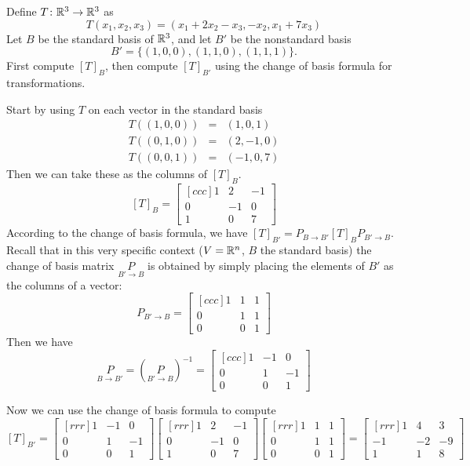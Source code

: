 \ii Define $T\colon {\mathbb R}^3\rightarrow{\mathbb R}^3$ as 
$$
T(x_1,x_2,x_3) = (x_1+2x_2-x_3,-x_2,x_1+7x_3)
$$
Let $B$ be the standard basis of ${\mathbb R}^3$, and let $B'$ be the nonstandard basis 
$$
B' = \{(1,0,0),(1,1,0),(1,1,1)\}.
$$
First compute $[T]_B$, then compute $[T]_{B'}$ using the change of basis formula for transformations. 
\\
\begin{solution}
\noindent
Start by using $T$ on each vector in the standard basis
\begin{eqnarray*}
T((1,0,0)) &=& (1,0,1)\\
T((0,1,0)) &=& (2,-1,0)\\
T((0,0,1)) &=& (-1,0,7)
\end{eqnarray*}
Then we can take these as the columns of $[T]_B$.
$$
[T]_B =
\begin{bmatrix}[ccc]
1&2&-1\\
0&-1&0\\
1&0&7
\end{bmatrix}
$$
According to the change of basis formula, we have  $[T]_{B'} = P_{B\rightarrow B'}[T]_BP_{B'\rightarrow B}$. 
Recall that in this very specific context ($V={\mathbb R}^n$, $B$ the standard basis) the change of basis matrix $\underset{B'\rightarrow B}{P}$ is obtained by simply placing the elements of $B'$ as the columns of a vector: 
\[
P_{B'\rightarrow B} =
\begin{bmatrix}[ccc]
1&1&1\\
0&1&1\\
0&0&1
\end{bmatrix}
\]
Then we have 
\[
\underset{B\rightarrow B'}{P}=(\underset{B'\rightarrow B}{P})^{-1}=
\begin{bmatrix}[ccc]
1&-1&0\\
0&1&-1\\
0&0&1
\end{bmatrix}
\]

Now we can use the change of basis formula to compute 
\[
[T]_{B'} = 
\begin{bmatrix}[rrr]
1&-1&0\\
0&1&-1\\
0&0&1
\end{bmatrix}
\begin{bmatrix}[rrr]
1&2&-1\\
0&-1&0\\
1&0&7
\end{bmatrix}
\begin{bmatrix}[rrr]
1&1&1\\
0&1&1\\
0&0&1
\end{bmatrix} =
\begin{bmatrix}[rrr]
1&4&3\\
-1&-2&-9\\
1&1&8
\end{bmatrix}
\]
\end{solution}
